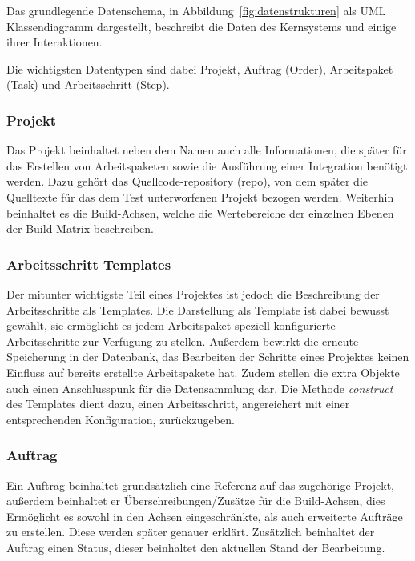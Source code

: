 Das grundlegende Datenschema, in Abbildung~\ref{fig:datenstrukturen} als UML Klassendiagramm dargestellt,
beschreibt die Daten des Kernsystems und einige ihrer Interaktionen.

Die wichtigsten Datentypen sind dabei Projekt, Auftrag (Order),
Arbeitspaket (Task) und Arbeitsschritt (Step).

\subsubsection{Projekt}

Das Projekt beinhaltet neben dem Namen auch alle Informationen,
die später für das Erstellen von Arbeitspaketen sowie
die Ausführung einer Integration benötigt werden.
Dazu gehört das Quellcode-repository (repo), von dem später
die Quelltexte für das dem Test unterworfenen Projekt bezogen werden.
Weiterhin beinhaltet es die Build-Achsen,
welche die Wertebereiche der einzelnen Ebenen der Build-Matrix
beschreiben.

\subsubsection{Arbeitsschritt Templates}

Der mitunter wichtigste Teil eines Projektes ist jedoch die Beschreibung der Arbeitsschritte als Templates.
Die Darstellung als Template ist dabei bewusst gewählt,
sie ermöglicht es jedem Arbeitspaket speziell konfigurierte Arbeitsschritte zur Verfügung zu stellen.
Außerdem bewirkt die erneute Speicherung in der Datenbank,
das Bearbeiten der Schritte eines Projektes keinen Einfluss auf bereits erstellte Arbeitspakete hat.
Zudem stellen die extra Objekte auch einen Anschlusspunk für die Datensammlung dar.
Die Methode \textit{construct} des Templates dient dazu,
einen Arbeitsschritt, angereichert mit einer entsprechenden Konfiguration, zurückzugeben.

\subsubsection{Auftrag}

Ein Auftrag beinhaltet grundsätzlich eine Referenz auf das zugehörige Projekt,
außerdem beinhaltet er Überschreibungen/Zusätze für die Build-Achsen,
dies Ermöglicht es sowohl in den Achsen eingeschränkte,
als auch erweiterte Aufträge zu erstellen.
Diese werden später genauer erklärt.
Zusätzlich beinhaltet der Auftrag einen Status, dieser beinhaltet den aktuellen Stand der Bearbeitung.

